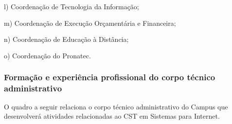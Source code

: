 l)      Coordena\c{c}\~ao de Tecnologia da Informa\c{c}\~ao;

m)      Coordena\c{c}\~ao de Execu\c{c}\~ao Or\c{c}ament\'aria e Financeira;

n)      Coordena\c{c}\~ao de Educa\c{c}\~ao \`a Dist\^ancia;

o)      Coordena\c{c}\~ao do Pronatec.


\subsubsection{Forma\c{c}\~ao e experi\^encia profissional do corpo t\'ecnico administrativo}


O quadro a seguir relaciona o corpo técnico administrativo do Campus que desenvolver\'a atividades relacionadas ao CST em Sistemas para Internet.
 

